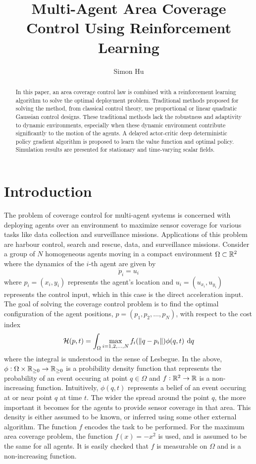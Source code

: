 \documentclass[10pt,conference]{IEEEtran}
\title{\bf\Large{Multi-Agent Area Coverage Control Using Reinforcement Learning}}
\author{Simon Hu}
\begin{document}
	
\maketitle
\thispagestyle{empty}
\pagestyle{empty}
\begin{abstract}
	In this paper, an area coverage control law is combined with a reinforcement learning algorithm to solve the optimal deployment problem. Traditional methods proposed for solving the method, from classical control theory, use proportional or linear quadratic Gaussian control designs. These traditional methods lack the robustness and adaptivity to dynamic environments, especially when these dynamic environment contribute significantly to the motion of the agents. A delayed actor-critic deep deterministic policy gradient algorithm is proposed to learn the value function and optimal policy. Simulation results are presented for stationary and time-varying scalar fields.
\end{abstract}
\section{Introduction}
	The problem of coverage control for multi-agent systems is concerned with deploying agents over an environment to maximize sensor coverage for various tasks like data collection and surveillance missions. Applications of this problem are harbour control, search and rescue, data, and surveillance missions. Consider a group of $N$ homogeneous agents moving in a compact environment $\Omega \subset \mathbb{R}^2$ where the dynamics of the $i$-th agent are given by 
	\begin{equation}
		\label{dynamics of robot}
		\displaystyle \ddot{p}_i = u_i
	\end{equation}
	where $p_i = (x_i, y_i)$ represents the agent's location and $u_i = (u_{x_i}, u_{y_i})$ represents the control input, which in this case is the direct acceleration input. The goal of solving the coverage control problem is to find the optimal configuration of the agent positions, $p = (p_1, p_2, \dots, p_N)$, with respect to the cost index
	\begin{equation}
		\label{cost function}
		\displaystyle \mathcal{H}(p, t) = \int_{\Omega}{\max\limits_{i=1,2,\dots,N}{f_i(\,\norm{q - p_i})}\phi(q,t) \: \dif q}
	\end{equation} 
	where the integral is understood in the sense of Lesbegue. In the above, $\phi: \Omega \times \mathbb{R}_{\geq 0} \to \mathbb{R}_{\geq 0}$ is a probibility density function that represents the probability of an event occuring at point $q \in \Omega$ and $f: \mathbb{R}^2 \to \mathbb{R}$ is a non-increasing function. Intuitively, $\phi(q,t)$ represents a belief of an event occuring at or near point $q$ at time $t$. The wider the spread around the point $q$, the more important it becomes for the agents to provide sensor coverage in that area. This density is either assumed to be known, or inferred using some other external algorithm. The function $f$ encodes the task to be performed. For the maximum area coverage problem, the function $f(x) = -x^2$ is used, and is assumed to be the same for all agents. It is easily checked that $f$ is measurable on $\Omega$ and is a non-increasing function.   
\end{document}
